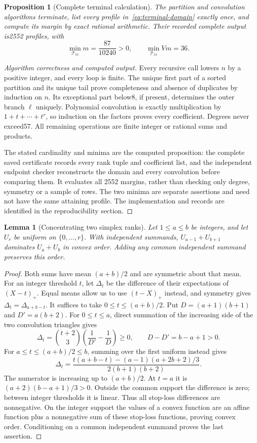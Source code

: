 \documentclass[11pt]{article}
\newtheorem{lemma}[theorem]{Lemma}
\newtheorem{proposition}[theorem]{Proposition}
\theoremstyle{remark}\newtheorem{remark}[theorem]{Remark}
\begin{document}
\begin{proposition}[Complete terminal calculation]\label{prop:terminal}
The partition and convolution algorithms terminate, list every
profile in~\eqref{eq:terminal-domain} exactly once, and compute its
margin by exact rational arithmetic. Their recorded complete output
is2552 profiles, with
\[
 \min_{\mathcal T_{57}}m=\frac{87}{10240}>0,
 \qquad\min_{\mathcal T_{57}}Vm=36.
\]
\end{proposition}
\begin{proof}[Algorithm correctness and computed output]
Every recursive call lowers $n$ by a positive integer, and every
loop is finite. The unique first part of a sorted partition and its
unique tail prove completeness and absence of duplicates by induction
on $n$. Its exceptional part below8, if present, determines the
outer branch $\ell$ uniquely. Polynomial convolution is exactly
multiplication by $1+t+\cdots+t^r$, so induction on the factors
proves every coefficient. Degrees never exceed57. All remaining
operations are finite integer or rational sums and products.

The stated cardinality and minima are the computed proposition:
the complete saved certificate records every rank tuple and
coefficient list, and the independent endpoint checker reconstructs
the domain and every convolution before comparing them. It evaluates
all 2552 margins, rather than checking only degree, symmetry or a
sample of rows. The two minima are separate assertions and need
not have the same attaining profile. The implementation and records
are identified in the reproducibility section.
\end{proof}

\begin{lemma}[Concentrating two simplex ranks]\label{lem:concentration}
Let $1\le a\le b$ be integers, and let $U_r$ be uniform on
$\{0,\ldots,r\}$. With independent summands,
$U_{a-1}+U_{b+1}$ dominates $U_a+U_b$ in convex order.
Adding any common independent summand preserves this order.
\end{lemma}
\begin{proof}
Both sums have mean $(a+b)/2$ and are symmetric about that mean.
For an integer threshold $t$, let $\Delta_t$ be the difference
of their expectations of $(X-t)_+$. Equal means allow us to use
$(t-X)_+$ instead, and symmetry gives
$\Delta_t=\Delta_{a+b-t}$. It suffices to take
$0\le t\le(a+b)/2$. Put $D=(a+1)(b+1)$ and $D'=a(b+2)$.
For $0\le t\le a$, direct summation of the increasing side of
the two convolution triangles gives
\[
 \Delta_t=\binom{t+2}{3}\left(\frac1{D'}-\frac1D\right)\ge0,
 \qquad D-D'=b-a+1>0.
\]
For $a\le t\le(a+b)/2\le b$, summing over the first uniform
instead gives
\[
 \Delta_t=
 \frac{t(a+b-t)-(a-1)(a+2b+2)/3}{2(b+1)(b+2)}.
\]
The numerator is increasing up to $(a+b)/2$. At $t=a$ it is
$(a+2)(b-a+1)/3>0$. Outside the common support the difference
is zero; between integer thresholds it is linear. Thus all
stop-loss differences are nonnegative. On the integer support the
values of a convex function are an affine function plus a
nonnegative sum of these stop-loss functions, proving convex order. Conditioning
on a common independent summand proves the last assertion.
\end{proof}
\end{document}
